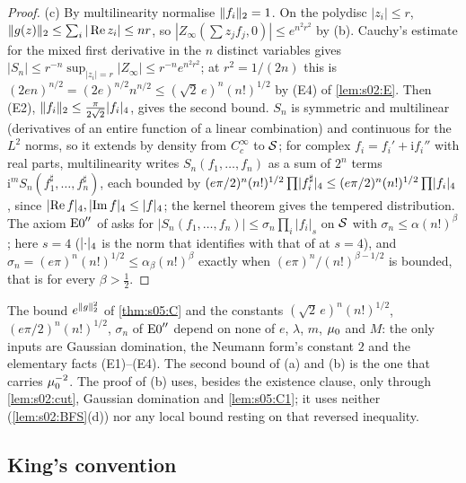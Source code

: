 \begin{proof}
(c) By multilinearity normalise $\lVert f_i\rVert_2=1$. On the polydisc $|z_i|\le r$, $\lVert g(z)\rVert_2\le\sum_i|\operatorname{Re} z_i|\le nr$, so $|Z_\infty(\sum z_jf_j,0)|\le e^{n^2r^2}$ by (b). Cauchy's estimate for the mixed first derivative in the $n$ distinct variables gives $|S_n|\le r^{-n}\sup_{|z_i|=r}|Z_\infty|\le r^{-n}e^{n^2r^2}$; at $r^2=1/(2n)$ this is $(2en)^{n/2}=(2e)^{n/2}n^{n/2}\le(\sqrt2\,e)^n(n!)^{1/2}$ by (E4) of \cref{lem:s02:E}. Then (E2), $\lVert f_i\rVert_2\le\frac\pi{2\sqrt2}\lvert f_i\rvert_{4}$, gives the second bound. $S_n$ is symmetric and multilinear (derivatives of an entire function of a linear combination) and continuous for the $L^2$ norms, so it extends by density from $C^\infty_c$ to $\mathcal S$; for complex $f_i=f_i'+\mathrm if_i''$ with real parts, multilinearity writes $S_n(f_1,\dots,f_n)$ as a sum of $2^n$ terms $\mathrm i^mS_n(f^\sharp_1,\dots,f^\sharp_n)$, each bounded by $(e\pi/2)^n(n!)^{1/2}\prod\lvert f^\sharp_i\rvert_{4}\le(e\pi/2)^n(n!)^{1/2}\prod\lvert f_i\rvert_{4}$, since $\lvert \operatorname{Re} f\rvert_{4},\lvert \operatorname{Im} f\rvert_{4}\le\lvert f\rvert_{4}$; the kernel theorem gives the tempered distribution. The axiom $\mathrm{E0}''$ of \cite[p.~287]{OS75} asks for $|S_n(f_1,\dots,f_n)|\le\sigma_n\prod_i|f_i|_s$ on $\mathcal S$ with $\sigma_n\le\alpha(n!)^\beta$; here $s=4$ ($\lvert \cdot\rvert_{4}$ is the norm that \cite{SymPhase} identifies with that of \cite{OS75} at $s=4$), and $\sigma_n=(e\pi)^n(n!)^{1/2}\le\alpha_\beta(n!)^\beta$ exactly when $(e\pi)^n/(n!)^{\beta-1/2}$ is bounded, that is for every $\beta>\frac12$.
\end{proof}

\begin{remark}\label{rem:s05:absolute}
The bound $e^{\lVert g\rVert_2^2}$ of \cref{thm:s05:C} and the constants $(\sqrt2\,e)^n(n!)^{1/2}$, $(e\pi/2)^n(n!)^{1/2}$, $\sigma_n$ of $\mathrm{E0}''$ depend on none of $e$, $\lambda$, $m$, $\mu_0$ and $M$: the only inputs are Gaussian domination, the Neumann form's constant $2$ and the elementary facts (E1)--(E4). The second bound of (a) and (b) is the one that carries $\mu_0^{-2}$. The proof of (b) uses, besides the existence clause, only \cite[Thm.~6.2(1),(2)]{BFS1} through \cref{lem:s02:cut}, Gaussian domination and \cref{lem:s05:C1}; it uses neither \cite[Thm.~6.2(3),(4)]{BFS1} (\cref{lem:s02:BFS}(d)) nor any local bound resting on that reversed inequality.
\end{remark}

\subsection{King's convention}

